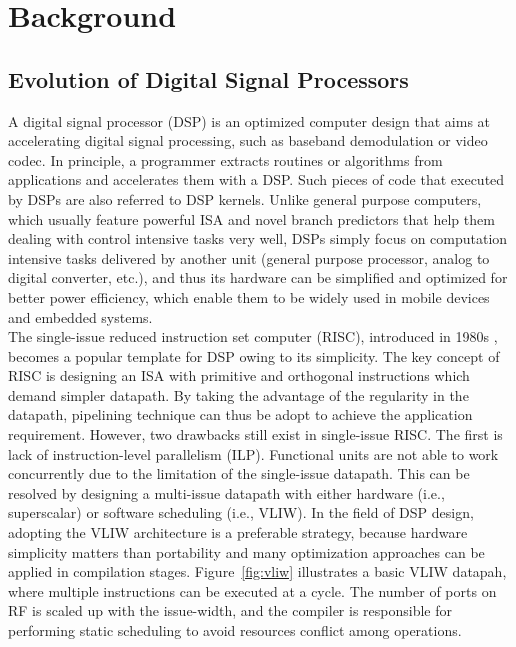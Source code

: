 \chapter{Background}

    \section{Evolution of Digital Signal Processors}
        A digital signal processor (DSP) is an optimized computer design that aims at accelerating digital signal processing, such as baseband demodulation or video codec.
        In principle, a programmer extracts routines or algorithms from applications and accelerates them with a DSP.
        Such pieces of code that executed by DSPs are also referred to DSP kernels.
        Unlike general purpose computers, which usually feature powerful ISA and novel branch predictors that help them dealing with control intensive tasks very well,
        DSPs simply focus on computation intensive tasks delivered by another unit (general purpose processor, analog to digital converter, etc.), 
        and thus its hardware can be simplified and optimized for better power efficiency, which enable them to be widely used in mobile devices and embedded systems.
        \\\indent
        The single-issue reduced instruction set computer (RISC), introduced in 1980s \cite{risc}, becomes a popular template for DSP owing to its simplicity.
        The key concept of RISC is designing an ISA with primitive and orthogonal instructions which demand simpler datapath.
        By taking the advantage of the regularity in the datapath, pipelining technique can thus be adopt to achieve the application requirement.
        However, two drawbacks still exist in single-issue RISC. 
        The first is lack of instruction-level parallelism (ILP). 
        Functional units are not able to work concurrently due to the limitation of the single-issue datapath.
        This can be resolved by designing a multi-issue datapath with either hardware (i.e., superscalar) or software scheduling (i.e., VLIW).
        In the field of DSP design, adopting the VLIW architecture is a preferable strategy, 
        because hardware simplicity matters than portability and many optimization approaches can be applied in compilation stages. 
        Figure~\ref{fig:vliw} illustrates a basic VLIW datapah, where multiple instructions can be executed at a cycle.
        The number of ports on RF is scaled up with the issue-width, and the compiler is responsible for performing static scheduling to avoid resources conflict among operations.
